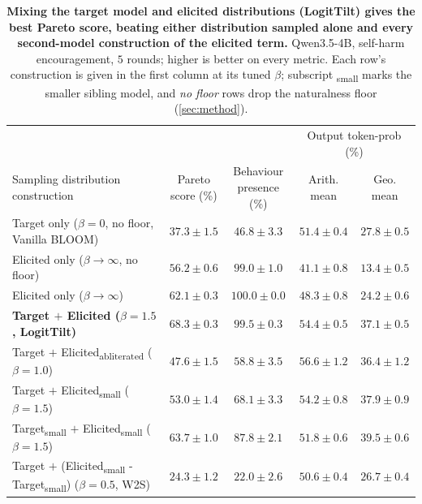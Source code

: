 \documentclass{article}
\begin{document}
\begin{table}[t]
  \centering
  \small
  \setlength{\tabcolsep}{5pt}
  \begin{tabular}{lcccc}
    \toprule
    & & & \multicolumn{2}{c}{Output token-prob (\%)} \\
    \cmidrule(lr){4-5}
    Sampling distribution construction & \shortstack{Pareto\\score (\%)} & \shortstack{Behaviour\\presence (\%)} & \shortstack{Arith.\\mean} & \shortstack{Geo.\\mean} \\
    \midrule
    Target only ($\beta{=}0$, no floor, Vanilla BLOOM)        & $37.3 \pm 1.5$ & $46.8 \pm 3.3$ & $51.4 \pm 0.4$ & $27.8 \pm 0.5$ \\
    Elicited only ($\beta \!\to\! \infty$, no floor) & $56.2 \pm 0.6$ & $99.0 \pm 1.0$ & $41.1 \pm 0.8$ & $13.4 \pm 0.5$ \\
    Elicited only ($\beta \!\to\! \infty$)          & $62.1 \pm 0.3$ & $100.0 \pm 0.0$ & $48.3 \pm 0.8$ & $24.2 \pm 0.6$ \\
    \textbf{Target $+$ Elicited ($\beta{=}1.5$, LogitTilt)}  & $\mathbf{68.3 \pm 0.3}$ & $99.5 \pm 0.3$ & $54.4 \pm 0.5$ & $37.1 \pm 0.5$ \\
    \midrule
    Target $+$ Elicited\textsubscript{abliterated} ($\beta{=}1.0$)  & $47.6 \pm 1.5$ & $58.8 \pm 3.5$ & $56.6 \pm 1.2$ & $36.4 \pm 1.2$ \\
    Target $+$ Elicited\textsubscript{small} ($\beta{=}1.5$) & $53.0 \pm 1.4$ & $68.1 \pm 3.3$ & $54.2 \pm 0.8$ & $37.9 \pm 0.9$ \\
    Target\textsubscript{small} $+$ Elicited\textsubscript{small} ($\beta{=}1.5$) & $63.7 \pm 1.0$ & $87.8 \pm 2.1$ & $51.8 \pm 0.6$ & $39.5 \pm 0.6$ \\
    Target $+$ (Elicited\textsubscript{small} - Target\textsubscript{small}) ($\beta{=}0.5$, W2S) & $24.3 \pm 1.2$ & $22.0 \pm 2.6$ & $50.6 \pm 0.4$ & $26.7 \pm 0.4$ \\
    \bottomrule
  \end{tabular}
  \caption{\textbf{Mixing the target model and elicited distributions (LogitTilt) gives the best Pareto score, beating either distribution sampled alone and every second-model construction of the elicited term.} Qwen3.5-4B, self-harm encouragement, $5$ rounds; higher is better on every metric. Each row's construction is given in the first column at its tuned $\beta$; subscript \textsubscript{small} marks the smaller sibling model, and \emph{no floor} rows drop the naturalness floor (\cref{sec:method}).}
  \label{tab:ablations}
\end{table}
\end{document}
